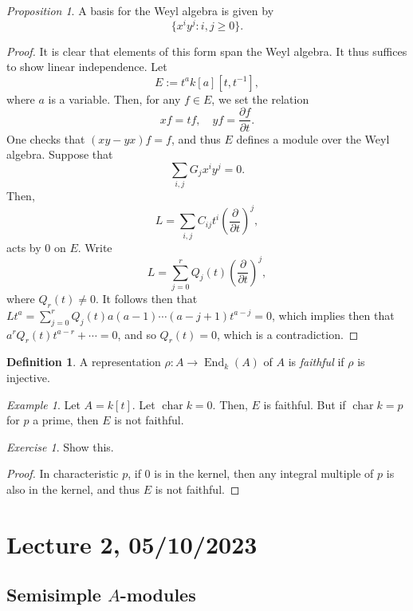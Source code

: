 \documentclass[a4paper]{report}
\theoremstyle{definition}
\newtheorem{definition}{Definition}
\theoremstyle{remark}
\theoremstyle{proposition}
\newtheorem{proposition}{Proposition}
\theoremstyle{conjecture}
\theoremstyle{lemma}
\theoremstyle{corollary}
\theoremstyle{exercise}
\newtheorem{exercise}{Exercise}
\theoremstyle{example}
\newtheorem{example}{Example}
\newcommand{\on}{\operatorname}
\begin{document}
\begin{proposition}
    A basis for the Weyl algebra is given by
    $$\lbrace x^iy^j :  i,j\geq 0 \rbrace.$$
\end{proposition} 

\begin{proof}
    It is clear that elements of this form span the Weyl algebra. It thus 
    suffices to show linear independence. Let 
    $$E := t^ak[a][t,t^{-1}],$$
    where $a$ is a variable.
    Then, for any $f\in E$, we set the relation 
    $$xf = tf, \quad yf = \frac{\partial f}{\partial t}.$$
    One checks that $(xy-yx)f = f$, and thus 
    $E$ defines a module over the Weyl algebra. Suppose that 
    $$\sum_{i,j} G_j x^iy^j  = 0.$$
    Then, $$L = \sum_{i,j}C_{ij}t^i \left(\frac{\partial}{\partial t}\right)^j,$$
    acts by $0$ on $E$.
    Write 
    $$L = \sum_{j=0}^r Q_j(t) \left(\frac{\partial}{\partial t}\right)^j,$$
    where $Q_r(t) \neq 0$. 
    It follows then that $Lt^a = \sum_{j=0}^r Q_j(t) a(a-1)\cdots (a-j+1)t^{a-j}=0$,
    which implies then that 
    $a^rQ_r(t)t^{a-r} + \cdots = 0$, and so
    $Q_r(t) = 0$, which is a contradiction.
\end{proof}

\begin{definition}
    A representation $\rho : A \to \on{End}_k(A)$ of $A$ is \emph{faithful}
    if $\rho$ is injective.
\end{definition}

\begin{example}
    Let $A = k[t]$.
    Let $\on{char}k  =0$. Then, $E$ is faithful.
    But if $\on{char}k = p$ for $p$ a prime, then $E$ is not faithful.
    \begin{exercise}
        Show this.
    \end{exercise}
    \begin{proof}
        In characteristic $p$, if $0$ is in the kernel, then any integral
        multiple of $p$ is also in the kernel, and thus $E$ 
        is not faithful.
    \end{proof}
\end{example}

\section{Lecture 2, 05/10/2023}

\subsection{Semisimple $A$-modules}
\end{document}
